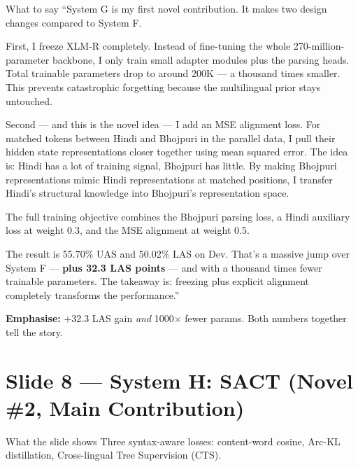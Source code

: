 \documentclass[11pt]{article}
\begin{document}
\begin{pitchbox}{What to say}
``System G is my first novel contribution. It makes two design changes compared to System F.

First, I freeze XLM-R completely. Instead of fine-tuning the whole 270-million-parameter backbone, I only train small adapter modules plus the parsing heads. Total trainable parameters drop to around 200K --- a thousand times smaller. This prevents catastrophic forgetting because the multilingual prior stays untouched.

Second --- and this is the novel idea --- I add an MSE alignment loss. For matched tokens between Hindi and Bhojpuri in the parallel data, I pull their hidden state representations closer together using mean squared error. The idea is: Hindi has a lot of training signal, Bhojpuri has little. By making Bhojpuri representations mimic Hindi representations at matched positions, I transfer Hindi's structural knowledge into Bhojpuri's representation space.

The full training objective combines the Bhojpuri parsing loss, a Hindi auxiliary loss at weight 0.3, and the MSE alignment at weight 0.5.

The result is 55.70\% UAS and 50.02\% LAS on Dev. That's a massive jump over System F --- \textbf{plus 32.3 LAS points} --- and with a thousand times fewer trainable parameters. The takeaway is: freezing plus explicit alignment completely transforms the performance.''
\end{pitchbox}

\begin{tipbox}
\textbf{Emphasise:} +32.3 LAS gain \textit{and} 1000$\times$ fewer params. Both numbers together tell the story.
\end{tipbox}

\section{Slide 8 --- System H: SACT (Novel \#2, Main Contribution)}

\begin{pitchbox}{What the slide shows}
Three syntax-aware losses: content-word cosine, Arc-KL distillation, Cross-lingual Tree Supervision (CTS).
\end{pitchbox}
\end{document}
